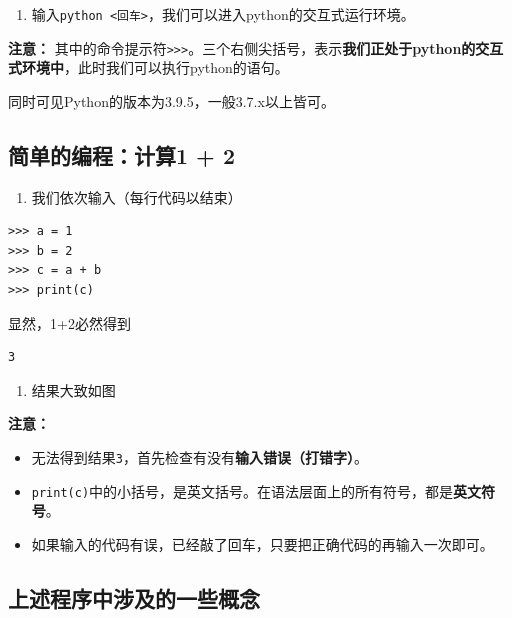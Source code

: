 \documentclass[
]{book}
\providecommand{\tightlist}{%
  \setlength{\itemsep}{0pt}\setlength{\parskip}{0pt}}
\begin{document}
\begin{enumerate}
\def\labelenumi{\arabic{enumi}.}
\setcounter{enumi}{2}
\tightlist
\item
  输入\texttt{python\ \textless{}回车\textgreater{}}，我们可以进入python的交互式运行环境。
\end{enumerate}

{\textbf{注意：}}
其中的命令提示符\texttt{\textgreater{}\textgreater{}\textgreater{}}。三个右侧尖括号，表示\textbf{我们正处于python的交互式环境中}，此时我们可以执行python的语句。

同时可见Python的版本为3.9.5，一般3.7.x以上皆可。

\hypertarget{ux7b80ux5355ux7684ux7f16ux7a0bux8ba1ux7b971-2}{%
\subsection{简单的编程：计算1 + 2}\label{ux7b80ux5355ux7684ux7f16ux7a0bux8ba1ux7b971-2}}

\begin{enumerate}
\def\labelenumi{\arabic{enumi}.}
\tightlist
\item
  我们依次输入（每行代码以结束）
\end{enumerate}

\begin{verbatim}
>>> a = 1
>>> b = 2
>>> c = a + b 
>>> print(c)
\end{verbatim}

显然，1+2必然得到

\begin{verbatim}
3
\end{verbatim}

\begin{enumerate}
\def\labelenumi{\arabic{enumi}.}
\setcounter{enumi}{1}
\tightlist
\item
  结果大致如图
\end{enumerate}

{\textbf{注意：}}

\begin{itemize}
\tightlist
\item
  无法得到结果\texttt{3}，首先检查有没有\textbf{输入错误（打错字）}。
\item
  \texttt{print(c)}中的小括号，是英文括号。在语法层面上的所有符号，都是\textbf{英文符号}。
\item
  如果输入的代码有误，已经敲了回车，只要把正确代码的再输入一次即可。
\end{itemize}

\hypertarget{ux4e0aux8ff0ux7a0bux5e8fux4e2dux6d89ux53caux7684ux4e00ux4e9bux6982ux5ff5}{%
\subsection{上述程序中涉及的一些概念}\label{ux4e0aux8ff0ux7a0bux5e8fux4e2dux6d89ux53caux7684ux4e00ux4e9bux6982ux5ff5}}
\end{document}
